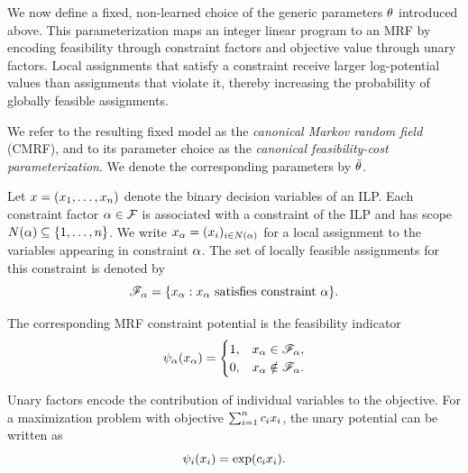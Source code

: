 We now define a fixed, non-learned choice of the generic parameters $\theta$ introduced above. This parameterization maps an integer linear program to an MRF by encoding feasibility through constraint factors and objective value through unary factors. Local assignments that satisfy a constraint receive larger log-potential values than assignments that violate it, thereby increasing the probability of globally feasible assignments.

We refer to the resulting fixed model as the \emph{canonical Markov random field} (CMRF), and to its parameter choice as the \emph{canonical feasibility-cost parameterization}. We denote the corresponding parameters by $\bar{\theta}$.

Let $x = (x_1,\ldots,x_{n})$ denote the binary decision variables of an ILP. Each constraint factor $\alpha \in \mathcal{F}$ is associated with a constraint of the ILP and has scope $N(\alpha) \subseteq \{ 1,\ldots, n\}$. We write $x_{\alpha} = (x_i)_{i \in N(\alpha)}$ for a local assignment to the variables appearing in constraint $\alpha$. The set of locally feasible assignments for this constraint is denoted by 
\begin{equation}
    \mathscr{F}_{\alpha}
    =
    \{x_{\alpha} : x_{\alpha}
    \text{ satisfies constraint } \alpha\}.
\end{equation}

The corresponding MRF constraint potential is the feasibility indicator
\begin{equation}
    \psi_{\alpha}(x_{\alpha})
    =
    \begin{cases}
        1, & x_{\alpha} \in \mathscr{F}_{\alpha},\\
        0, & x_{\alpha} \notin \mathscr{F}_{\alpha}.
    \end{cases}
\end{equation}

Unary factors encode the contribution of individual variables to the objective. For a maximization problem with objective $\sum_{i=1}^{n} c_i x_i$, the unary potential can be written as
\begin{equation}
    \psi_i(x_i) = \exp(c_i x_i).
\end{equation}

